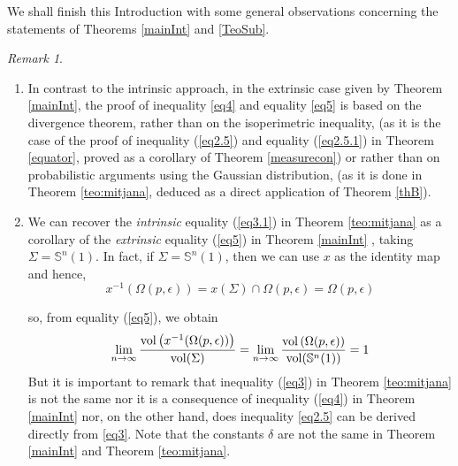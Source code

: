 \documentclass[11pt,letterpaper]{amsart}
\theoremstyle{definition}
\theoremstyle{remark}
\newtheorem{remark}[theorem]{Remark}
\begin{document}
We shall finish this Introduction with some general observations concerning the statements of Theorems \ref{mainInt} and \ref{TeoSub}.
\bigskip


\begin{remark}\label{remarkone}\



\begin{enumerate}
\item In contrast to the intrinsic approach, in the extrinsic case given by Theorem \ref{mainInt}, the proof of inequality \eqref{eq4} and equality \eqref{eq5} is based on the divergence theorem, rather than on the isoperimetric inequality, (as it is the case of the proof of inequality (\ref{eq2.5}) and equality (\ref{eq2.5.1}) in Theorem \ref{equator}, proved as a corollary of Theorem \ref{measurecon}) or rather than on probabilistic arguments using the Gaussian distribution, (as it is done in Theorem \ref{teo:mitjana}, deduced as a direct application of Theorem \ref{thB}).
\medskip

\item We can recover the {\em intrinsic} equality  (\ref{eq3.1}) in Theorem \ref{teo:mitjana} as a corollary of the {\em extrinsic} equality (\ref{eq5}) in Theorem \ref{mainInt} , taking $\Sigma=\mathbb{S}^n(1)$. In fact, if $\Sigma=\mathbb{S}^n(1)$, then we can use $x$ as the identity map  and hence, 
$$x^{-1}(\Omega(p,\epsilon))=x(\Sigma) \cap \Omega(p,\epsilon) =\Omega(p,\epsilon)$$

\noindent so, from equality (\ref{eq5}), we obtain
$$
\lim_{n\to\infty}\frac{{\rm vol}\left(x^{-1}(\Omega(p,\epsilon))\right)}{{\rm vol}(\Sigma)}=\lim_{n\to\infty}\frac{{\rm vol}\left(\Omega(p,\epsilon)\right)}{{\rm vol}(\mathbb{S}^n(1))}=1
$$
But it is important to remark that inequality (\ref{eq3}) in Theorem \ref{teo:mitjana} is not the same nor it is  a consequence of inequality (\ref{eq4}) in Theorem \ref{mainInt} nor, on the other hand, does inequality \eqref{eq2.5} can  be derived directly from \eqref{eq3}. Note that the constants $\delta$ are not the same in Theorem \ref{mainInt} and Theorem \ref{teo:mitjana}.
\medskip



\end{enumerate}
\end{remark}
\end{document}
